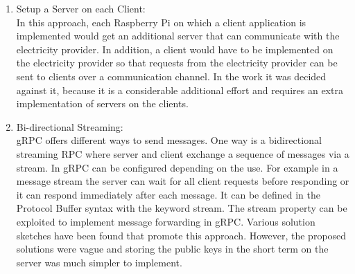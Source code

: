 \begin{enumerate}
\item Setup a Server on each Client:\\
In this approach, each Raspberry Pi on which a client application is implemented would get an additional server that can communicate with the electricity provider. In addition, a client would have to be implemented on the electricity provider so that requests from the electricity provider can be sent to clients over a communication channel. In the work it was decided against it, because it is a considerable additional effort and requires an extra implementation of servers on the clients.
\item Bi-directional Streaming:\\
gRPC offers different ways to send messages. One way is a bidirectional streaming \gls{RPC} where server and client exchange a sequence of messages via a stream. In gRPC can be configured depending on the use.
For example in a message stream the server can wait for all client requests before responding or it can respond immediately after each message. It can be defined in the Protocol Buffer syntax with the keyword stream. The stream property can be exploited to implement message forwarding in gRPC. Various solution sketches have been found that promote this approach. However, the proposed solutions were vague and storing the public keys in the short term on the server was much simpler to implement. 
\end{enumerate}\\

